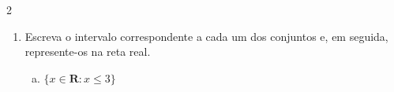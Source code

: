 \documentclass[a4paper,14pt]{article}
\begin{document}
\begin{multicols}{2}
\begin{enumerate}
	    	\begin{enumerate}[a)]
	    		\item $[-3;4]$ \\\\\\\\\\\\
	    		\item $]0;10]$ \\\\\\\\\\\\
	    		\item $[-7;-2[$ \\\\\\\\\\\\
	    		\item $[21;22[$ \\\\\\\\\\\\
	    		\item $-\infty;4]$ \\\\\\\\\\\\
	    		\item $[-1; +\infty[$ \\\\\\\\\\\\
	    	\end{enumerate}
    	    \item Escreva o intervalo correspondente a cada um dos conjuntos e, em seguida, represente-os na reta real.
    	    \begin{enumerate}[a)]
    	        \item $\{x \in \mathbb{\textbf{R}}:x \leq 3\}$ \\\\\\\\\\\\

\end{enumerate}
\end{enumerate}
\end{multicols}
\end{document}
